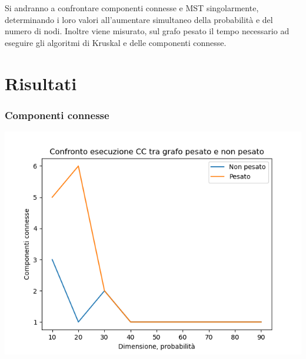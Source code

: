 \documentclass[
]{article}
\begin{document}
Si andranno a confrontare componenti connesse e MST singolarmente,
determinando i loro valori all'aumentare simultaneo della probabilità e
del numero di nodi. Inoltre viene misurato, sul grafo pesato il tempo
necessario ad eseguire gli algoritmi di Kruskal e delle componenti
connesse.

\hypertarget{risultati}{%
\section{Risultati}\label{risultati}}

\hypertarget{componenti-connesse-1}{%
\subsubsection{Componenti connesse}\label{componenti-connesse-1}}
\includegraphics{../img/cc.png}
\end{document}
